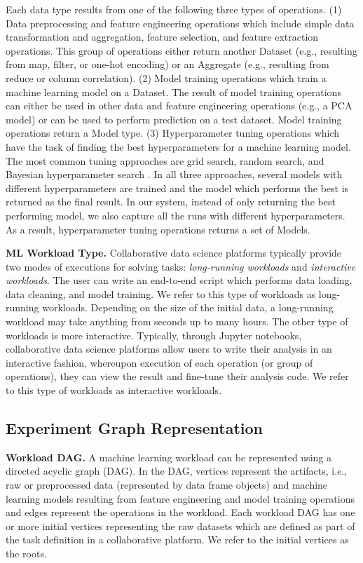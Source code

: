 Each data type results from one of the following three types of operations.
(1) Data preprocessing and feature engineering operations which include simple data transformation and aggregation, feature selection, and feature extraction operations.
This group of operations either return another Dataset (e.g., resulting from map, filter, or one-hot encoding) or an Aggregate (e.g., resulting from reduce or column correlation).
(2) Model training operations which train a machine learning model on a Dataset.
The result of model training operations can either be used in other data and feature engineering operations (e.g., a PCA model) or can be used to perform prediction on a test dataset.
Model training operations return a Model type.
(3) Hyperparameter tuning operations which have the task of finding the best hyperparameters for a machine learning model.
The most common tuning approaches are grid search, random search, and Bayesian hyperparameter search \cite{bergstra2012random,snoek2012practical}.
In all three approaches, several models with different hyperparameters are trained and the model which performs the best is returned as the final result.
In our system, instead of only returning the best performing model, we also capture all the runs with different hyperparameters.
As a result, hyperparameter tuning operations returns a set of Models.
 
\textbf{ML Workload Type.}
Collaborative data science platforms typically provide two modes of executions for solving tasks:
\textit{long-running workloads} and \textit{interactive workloads}.
The user can write an end-to-end script which performs data loading, data cleaning, and model training. We refer to this type of workloads as long-running workloads.
Depending on the size of the initial data, a long-running workload may take anything from seconds up to many hours.
The other type of workloads is more interactive.
Typically, through Jupyter notebooks, collaborative data science platforms allow users to write their analysis in an interactive fashion, whereupon execution of each operation (or group of operations), they can view the result and fine-tune their analysis code.
We refer to this type of workloads as interactive workloads.

\subsection{Experiment Graph Representation}\label{sub-graph-construction}
\textbf{Workload DAG.}
A machine learning workload can be represented using a directed acyclic graph (DAG).
In the DAG, vertices represent the artifacts, i.e., raw or preprocessed data (represented by data frame objects) and machine learning models resulting from feature engineering and model training operations and edges represent the operations in the workload.
Each workload DAG has one or more initial vertices representing the raw datasets which are defined as part of the task definition in a collaborative platform.
We refer to the initial vertices as the roots.

